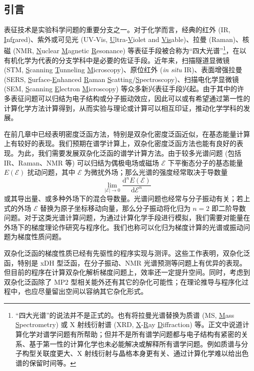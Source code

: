 \subsection{引言}

表征技术是实验科学问题的重要分支之一。对于化学而言，经典的红外 (IR, \underline{I}nf\underline{r}ared)、紫外或可见光 (UV-Vis, \underline{U}ltra-\underline{V}iolet and \underline{Vis}able)、拉曼 (Raman)、核磁 (NMR, \underline{N}uclear \underline{M}agnetic \underline{R}esonance) 等表征手段被合称为“四大光谱”\footnote{“四大光谱”的说法并不是正式的。也有将拉曼光谱替换为质谱 (MS, \underline{M}ass \underline{S}pectrometry) 或 X 射线衍射谱 (XRD, \underline{X}-\underline{R}ay \underline{D}iffraction) 等。正文中说道计算化学对谱学问题有所帮助；但并不是所有谱学问题都与电子结构有紧密的关系、基于第一性的计算化学也未必能解决或解释所有谱学问题。例如质谱与分子构型关联度更大、X 射线衍射与晶格本身更有关、通过计算化学难以给出色谱的保留时间等。}，在以有机化学为代表的分支学科中是必要的佐证手段。近年来，扫描隧道显微镜 (STM, \underline{S}canning \underline{T}unneling \underline{M}icroscopy)、原位红外 (\emph{in situ} IR)、表面增强拉曼 (SERS, \underline{S}urface-\underline{E}nhanced \underline{R}aman \underline{S}catting/\underline{S}pectroscopy)、扫描电化学显微镜 (SEM, \underline{S}canning \underline{E}lectron \underline{M}icroscopy) 等众多新兴表征手段兴起。由于其中的许多表征问题可以归结为电子结构或分子振动效应，因此可以或有希望通过第一性的计算化学方法计算得到，从而实验与理论或计算可以相互印证，推动化学学科的发展。

在前几章中已经表明密度泛函方法，特别是双杂化密度泛函近似，在基态能量计算上有较好的表现。我们预期在谱学计算上，双杂化密度泛函方法也能有良好的表现。为此，我们需要发展双杂化泛函的谱学计算方法。由于较多光谱问题 (包括 IR、Raman、NMR 等) 可以归结为偶极电场或磁场 $\pmb{\mathcal{E}}$ 下平衡态分子的基态能量 $E(\pmb{\mathcal{E}})$ 扰动问题，其中 $\pmb{\mathcal{E}}$ 为微扰外场；那么光谱的强度经常取决于导数量
\begin{equation}
  \lim_{|\pmb{\mathcal{E}}| \rightarrow 0} \frac{\mathrm{d}^n E(\pmb{\mathcal{E}})}{\mathrm{d} \pmb{\mathcal{E}}^n}
\end{equation}
或其导出量、或多种外场下的混合导数量。光谱问题也经常与分子振动有关；若上式的外场 $\pmb{\mathcal{E}}$ 替换为原子坐标移动向量，那么分子振动将化归为 $n = 2$ 即二阶导数问题。对于这类光谱计算问题，为通过计算化学手段进行模拟，我们需要对能量在外场下的梯度理论作研究与程序化。我们也称可以化归为梯度计算的光谱或振动问题为\textsf{梯度性质}问题。

双杂化泛函的梯度性质已经有先驱性的程序实现与测评\cite{Neese-Grimme.JCP.2007, Biczysko-Barone.JCTC.2010, Su-Xu.JCC.2013, Stoychev-Neese.JCTC.2018, Gu-Xu.JCTC.2021, Yan-Xu.JCTC.2022}。这些工作表明，双杂化泛函，特别是 xDH 型泛函，在分子振动、NMR 光谱预测等问题上有优异的表现。但目前的程序在计算双杂化解析梯度问题上，效率还一定提升空间。同时，考虑到双杂化泛函除了 MP2 型相关能外还有其它的杂化可能性；在理论推导与程序化过程中，也应尽量留出空间以容纳其它杂化形式。

